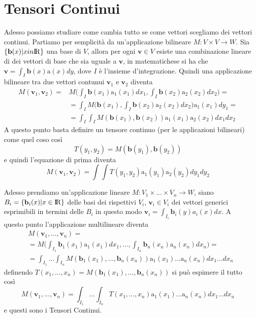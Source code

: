 \documentclass[11pt,a4paper]{report}
\newcommand{\vettore}[1]{\mathbf{#1}}
\newcommand{\vettorec}[1]{\textrm{#1}}
\theoremstyle{definition}
\theoremstyle{plain}
\theoremstyle{plain}
\begin{document}
		\section{Tensori Continui}
			Adesso possiamo studiare come cambia tutto se come vettori scegliamo dei vettori continui.\newline
			Partiamo per semplicità da un'applicazione bilineare $M:V\times V\rightarrow W$.
			Sia $\{\vettore b(x)|x in \rm I\!R\}$ una base di $V$, allora per ogni $\vettore v\in V$ esiste una combinazione lineare di dei vettori di base che sia uguale a $\vettore v$, in matematichese si ha che $\vettore v=\int_I \vettore b(x)\vettorec a(x)dy$, dove $I$ è l'insieme d'integrazione. Quindi una applicazione bilineare tra due vettori contunui $\vettore v_1$ e $\vettore v_2$ diventa
			\begin{equation}
			\begin{split}
				M(\vettore v_1,\vettore v_2)=& M\bigg(\int_I \vettore b(x_1)\vettorec a_1(x_1)dx_1,\int_I \vettore b(x_2)\vettorec a_2(x_2)dx_2\bigg)=\\
				& =\int_I M\bigg(\vettore b(x_1),\int_I \vettore b(x_2)\vettorec a_2(x_2)dx_2\bigg)\vettorec a_1(x_1)dy_1=\\
				&=\int_I \int_I M(\vettore b(x_1),\vettore b(x_2))\vettorec a_1(x_1)\vettorec a_2(x_2)dx_1dx_2
			\end{split}
			\end{equation}
			A questo punto basta definire un tensore continuo (per le applicazioni bilineari) come quel coso così
			\[
				T(y_1,y_2)=M(\vettore b(y_1),\vettore b(y_2))
			\]
			e quindi l'equazione di prima diventa
			\[
				M(\vettore v_1,\vettore v_2)=\int \int T(y_1,y_2)\vettorec a_1(y_1)\vettorec a_2(y_2)dy_1dy_2
			\]
			\newline

			Adesso prendiamo un'applicazione lineare $M:V_1\times\dots\times V_n\rightarrow W$, siano $B_i=\{\vettore b_i(x)|x\in \rm I \! R\}$ delle basi dei rispettivi $V_i$, $\vettore v_i \in V_i$ dei vettori generici esprimibili in termini delle $B_i$ in questo modo $\vettore v_i=\int_{I_i} \vettore b_i(y)a_i(x)dx$.
			A questo punto l'applicazione multilineare diventa
			\begin{equation}
			\begin{split}
				& M(\vettore v_1,\dots,\vettore v_n)=\\
				&=M\bigg(\int_{I_1} \vettore b_1(x_1)\vettorec a_1(x_1)dx_1,\dots,\int_{I_n} \vettore b_n(x_n)\vettorec a_n(x_n)dx_n\bigg)=\\
				&=\int_{I_1}\dots\int_{I_n}M(\vettore b_1(x_1),\dots,\vettore b_n(x_n))
				\vettorec a_1(x_1)\dots\vettorec a_n(x_n)dx_1\dots dx_n
			\end{split}
			\end{equation}
			definendo $T(x_1,\dots,x_n)=M(\vettore b_1(x_1),\dots,\vettore b_n(x_n))$ si può espimere il tutto così
			\begin{equation}
			\label{eq:prod_vett_tens}
				M(\vettore v_1,\dots,\vettore v_n)=\int_{I_1}\dots\int_{I_n}T(x_1,\dots,x_n)
				\vettorec a_1(x_1)\dots\vettorec a_n(x_n)dx_1\dots dx_n
			\end{equation}
			e questi sono i Tensori Continui.
\end{document}
